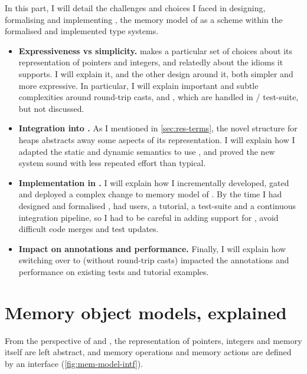 In this part, I will detail the challenges and choices I faced in designing,
formalising and implementing , the memory model of  as a scheme
within the formalised and implemented type systems.
\begin{itemize}
    \item \textbf{Expressiveness vs simplicity.}  makes a particular
        set of choices about its representation of pointers and integers, and relatedly
        about the idioms it supports. I will explain it, and the other
        design around it, both simpler and more expressive. In particular,
        I will explain important and subtle complexities around round-trip casts,
         and , which are handled in
        / test-suite, but not discussed.
    \item \textbf{Integration into .} As I mentioned in
        \cref{sec:res-terms}, the novel structure for heaps abstracts away
        some aspects of its representation. I will explain how I adapted the
        static and dynamic semantics to use , and proved the new system
        sound with less repeated effort than typical.
    \item \textbf{Implementation in .} I will explain how I incrementally
        developed, gated and deployed a complex change to memory model of .
        By the time I had designed and formalised ,  had
        users, a tutorial, a test-suite and a continuous integration pipeline,
        so I had to be careful in adding support for , avoid difficult
        code merges and test updates.
    \item \textbf{Impact on annotations and performance.} Finally, I will explain
        how switching over to  (without round-trip casts) impacted
        the annotations and performance on existing  tests and tutorial
        examples.
\end{itemize}

\chapter{Memory object models, explained}\label{chap:mem-model-explained}

\margintoc%

From the perspective of  and , the representation of
pointers, integers and memory itself are left abstract, and memory operations
and memory actions are defined by an interface (\cref{fig:mem-model-intf}).

